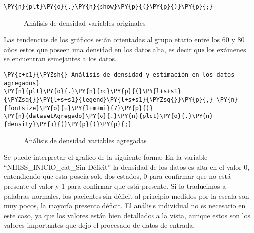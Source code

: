 \begin{tcolorbox}[breakable, size=fbox, boxrule=1pt, pad at break*=1mm,colback=cellbackground, colframe=cellborder]
\begin{Verbatim}[commandchars=\\\{\}]
\PY{n}{plt}\PY{o}{.}\PY{n}{show}\PY{p}{(}\PY{p}{)}\PY{p}{;}
\end{Verbatim}
\end{tcolorbox}


\begin{center}
    	\begin{figure}[H]
	\centering
	\caption{Análisis de densidad variables originales}
	\label{fig:advo}
	\end{figure}
\end{center}
    
    Las tendencias de los gráficos están orientadas al grupo etario entre
los 60 y 80 años estos que poseen una densidad en los datos alta, es
decir que los exámenes se encuentran semejantes a los datos.

    \begin{tcolorbox}[breakable, size=fbox, boxrule=1pt, pad at break*=1mm,colback=cellbackground, colframe=cellborder]
\begin{Verbatim}[commandchars=\\\{\}]
\PY{c+c1}{\PYZsh{} Análisis de densidad y estimación en los datos agregados}
\PY{n}{plt}\PY{o}{.}\PY{n}{rc}\PY{p}{(}\PY{l+s+s1}{\PYZsq{}}\PY{l+s+s1}{legend}\PY{l+s+s1}{\PYZsq{}}\PY{p}{,} \PY{n}{fontsize}\PY{o}{=}\PY{l+m+mi}{7}\PY{p}{)}
\PY{n}{datasetAgregado}\PY{o}{.}\PY{n}{plot}\PY{o}{.}\PY{n}{density}\PY{p}{(}\PY{p}{)}\PY{p}{;}
\end{Verbatim}
\end{tcolorbox}

\begin{center}
    	\begin{figure}[H]
	\centering
	\caption{Análisis de densidad variables agregadas}
	\label{fig:adva}
	\end{figure}
\end{center}
    
    Se puede interpretar el grafico de la siguiente forma: En la variable
``NIHSS\_INICIO\_cat\_Sin Déficit'' la densidad de los datos es alta en
el valor 0, entendiendo que esta poseía solo dos estados, 0 para
confirmar que no está presente el valor y 1 para confirmar que está
presente. Si lo traducimos a palabras normales, los pacientes sin
déficit al principio medidos por la escala son muy pocos, la mayoría
presenta déficit. El análisis individual no es necesario en este caso,
ya que los valores están bien detallados a la vista, aunque estos son
los valores importantes que dejo el procesado de datos de entrada.

